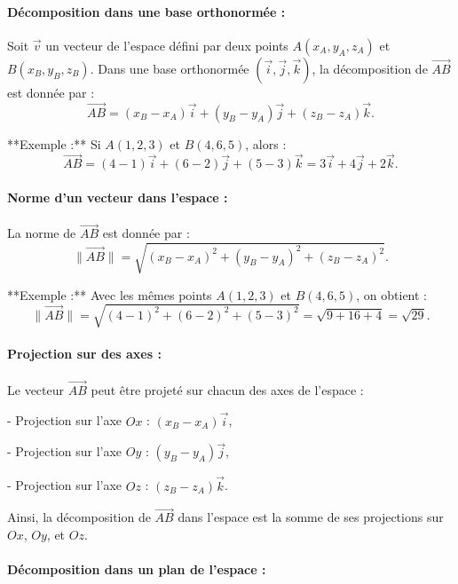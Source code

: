\documentclass{article}
\begin{document}
\paragraph{Décomposition dans une base orthonormée :}

Soit \( \vec{v} \) un vecteur de l’espace défini par deux points \( A(x_A, y_A, z_A) \) et \( B(x_B, y_B, z_B) \).  
Dans une base orthonormée \((\vec{i}, \vec{j}, \vec{k})\), la décomposition de \( \overrightarrow{AB} \) est donnée par :  
\[
\overrightarrow{AB} = (x_B - x_A) \vec{i} + (y_B - y_A) \vec{j} + (z_B - z_A) \vec{k}.
\]

**Exemple :**  
Si \( A(1, 2, 3) \) et \( B(4, 6, 5) \), alors :  
\[
\overrightarrow{AB} = (4 - 1)\vec{i} + (6 - 2)\vec{j} + (5 - 3)\vec{k} = 3\vec{i} + 4\vec{j} + 2\vec{k}.
\]

\paragraph{Norme d’un vecteur dans l’espace :}

La norme de \( \overrightarrow{AB} \) est donnée par :  
\[
\|\overrightarrow{AB}\| = \sqrt{(x_B - x_A)^2 + (y_B - y_A)^2 + (z_B - z_A)^2}.
\]

**Exemple :**  
Avec les mêmes points \( A(1, 2, 3) \) et \( B(4, 6, 5) \), on obtient :  
\[
\|\overrightarrow{AB}\| = \sqrt{(4-1)^2 + (6-2)^2 + (5-3)^2} = \sqrt{9 + 16 + 4} = \sqrt{29}.
\]

\paragraph{Projection sur des axes :}

Le vecteur \( \overrightarrow{AB} \) peut être projeté sur chacun des axes de l’espace :

- Projection sur l’axe \( Ox \) : \( (x_B - x_A)\vec{i} \),

- Projection sur l’axe \( Oy \) : \( (y_B - y_A)\vec{j} \),

- Projection sur l’axe \( Oz \) : \( (z_B - z_A)\vec{k} \).

Ainsi, la décomposition de \( \overrightarrow{AB} \) dans l’espace est la somme de ses projections sur \( Ox \), \( Oy \), et \( Oz \).

\paragraph{Décomposition dans un plan de l’espace :}
\end{document}

